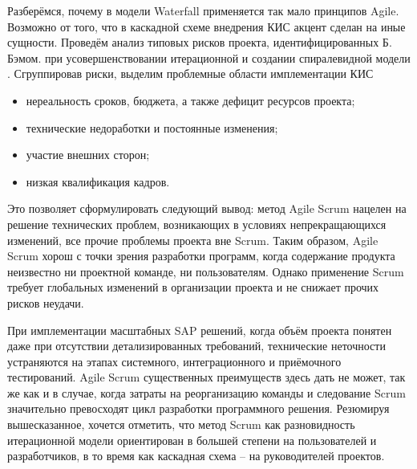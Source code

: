 \documentclass[12pt]{article}
\begin{document}
Разберёмся, почему в модели Waterfall применяется так мало принципов Agile.
Возможно от того, что в каскадной схеме внедрения КИС акцент сделан на иные
сущности. Проведём анализ типовых рисков проекта, идентифицированных Б. Бэмом.
при усовершенствовании итерационной и создании спиралевидной модели \cite{InfoSysImplementation}.
Сгруппировав риски, выделим проблемные области имплементации КИС

\begin{itemize}
  \item нереальность сроков, бюджета, а также дефицит ресурсов проекта;
  \item технические недоработки и постоянные изменения;
  \item участие внешних сторон;
  \item низкая квалификация кадров.
\end{itemize}

Это позволяет сформулировать следующий вывод: метод Agile Scrum нацелен на
решение технических проблем, возникающих в условиях непрекращающихся
изменений, все прочие проблемы проекта вне Scrum. Таким образом, Agile Scrum
хорош с точки зрения разработки программ, когда содержание продукта неизвестно ни
проектной команде, ни пользователям. Однако применение Scrum требует глобальных
изменений в организации проекта и не снижает прочих рисков неудачи.

При имплементации масштабных SAP решений, когда объём проекта понятен
даже при отсутствии детализированных требований, технические неточности
устраняются на этапах системного, интеграционного и приёмочного тестирований.
Agile Scrum существенных преимуществ здесь дать не может, так же как и в случае,
когда затраты на реорганизацию команды и следование Scrum значительно
превосходят цикл разработки программного решения. Резюмируя вышесказанное,
хочется отметить, что метод Scrum как разновидность итерационной модели
ориентирован в большей степени на пользователей и разработчиков, в то время как
каскадная схема – на руководителей проектов.
% 
% 

\printbibliography[title={Литература}]
\end{document}
